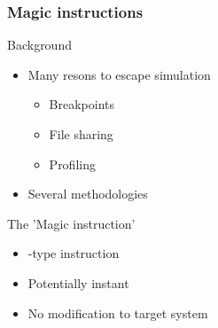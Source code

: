 \begin{frame}
\frametitle{Magic instructions}

\begin{block}{Background}
	\begin{itemize}
		\item Many resons to escape simulation
		\begin{itemize}
			\item Breakpoints
			\item File sharing
			\item Profiling
		\end{itemize}
		\item Several methodologies
	\end{itemize}
\end{block}

\begin{block}{The 'Magic instruction'}
	\begin{itemize}
		\item {}-type instruction\footnotemark
		\item Potentially instant
		\item No modification to target system
	\end{itemize}
\end{block}


\end{frame}
